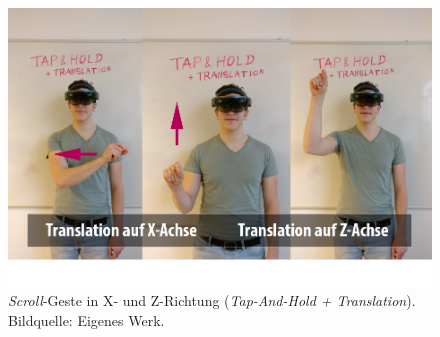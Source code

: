 \begin{figure}[H]
	\centering
	\includegraphics[width=1.0\textwidth]{figuren/scroll}
	\caption{\textit{Scroll}-Geste in X- und Z-Richtung (\textit{Tap-And-Hold + Translation}). Bildquelle: Eigenes Werk.}
	\label{fig:scroll}
\end{figure}
